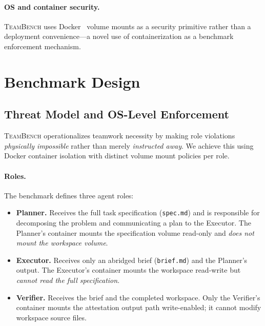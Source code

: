\documentclass{article}
\newcommand{\teambench}{\textsc{TeamBench}}
\newcommand{\sys}[1]{\texttt{#1}}
\begin{document}
\paragraph{OS and container security.}
\teambench{} uses Docker~\cite{docker2024, boettiger2015docker} volume mounts
as a security primitive rather than a deployment convenience---a novel use
of containerization as a benchmark enforcement mechanism.

\section{Benchmark Design}
\label{sec:design}

\subsection{Threat Model and OS-Level Enforcement}
\label{sec:design:threat}

\teambench{} operationalizes teamwork necessity by making role violations
\emph{physically impossible} rather than merely \emph{instructed away}. We
achieve this using Docker container isolation with distinct volume mount
policies per role.

\paragraph{Roles.}
The benchmark defines three agent roles:
\begin{itemize}
  \item \textbf{Planner.} Receives the full task specification
        (\sys{spec.md}) and is responsible for decomposing the problem and
        communicating a plan to the Executor. The Planner's container mounts
        the specification volume read-only and \emph{does not mount the
        workspace volume}.
  \item \textbf{Executor.} Receives only an abridged brief (\sys{brief.md})
        and the Planner's output. The Executor's container mounts the
        workspace read-write but \emph{cannot read the full specification}.
  \item \textbf{Verifier.} Receives the brief and the completed workspace.
        Only the Verifier's container mounts the attestation output path
        write-enabled; it cannot modify workspace source files.
\end{itemize}
\end{document}

